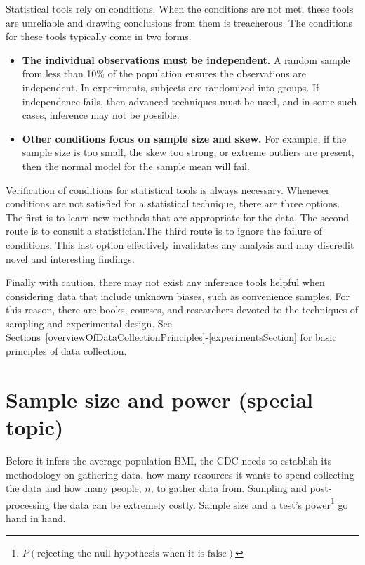 Statistical tools rely on conditions. When the conditions are not met, these tools are unreliable and drawing conclusions from them is treacherous. The conditions for these tools typically come in two forms.
\begin{itemize}
\setlength{\itemsep}{0mm}
\item \textbf{The individual observations must be independent.} A random sample from less than 10\% of the population ensures the observations are independent. In experiments, subjects are randomized into groups. If independence fails, then advanced techniques must be used, and in some such cases, inference may not be possible.
\item \textbf{Other conditions focus on sample size and skew.} For example, if the sample size is too small, the skew too strong, or extreme outliers are present, then the normal model for the sample mean will fail.
\end{itemize}
Verification of conditions for statistical tools is always necessary. Whenever conditions are not satisfied for a statistical technique, there are three options. The first is to learn new methods that are appropriate for the data. The second route is to consult a statistician.The third route is to ignore the failure of conditions. This last option effectively invalidates any analysis and may discredit novel and interesting findings.

Finally with caution, there may not exist any inference tools helpful when considering data that include unknown biases, such as convenience samples. For this reason, there are books, courses, and researchers devoted to the techniques of sampling and experimental design. See Sections~\ref{overviewOfDataCollectionPrinciples}-\ref{experimentsSection} for basic principles of data collection.


\section{Sample size and power (special topic)}
\label{sampleSizeAndPower}

Before it infers the average population BMI, the CDC needs to establish its methodology on gathering data, how many resources it wants to spend collecting the data and how many people, $n$, to gather data from. Sampling and post-processing the data can be extremely costly. Sample size and a test's power\footnote{$P(\text{rejecting the null hypothesis when it is false})$} go hand in hand.  

